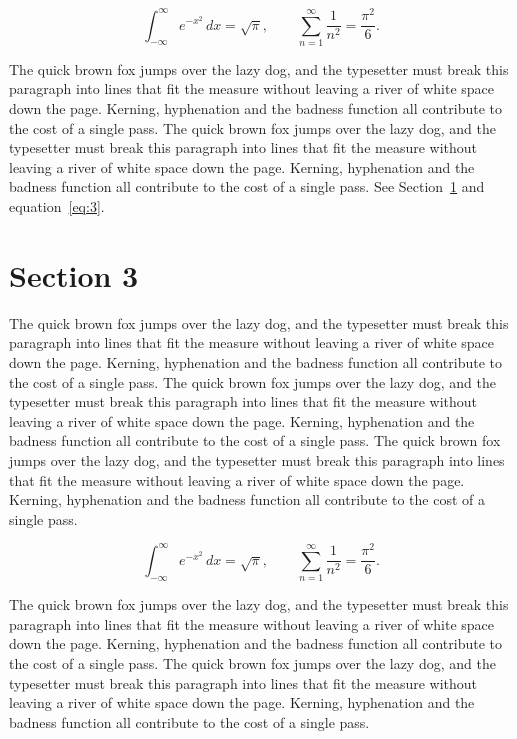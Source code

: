 \documentclass{article}
\begin{document}
\begin{equation}\label{eq:2}
\int_{-\infty}^{\infty} e^{-x^{2}}\,dx = \sqrt{\pi}, \qquad
\sum_{n=1}^{\infty} \frac{1}{n^{2}} = \frac{\pi^{2}}{6}.
\end{equation}

The quick brown fox jumps over the lazy dog, and the typesetter must break this paragraph into lines that fit the measure without leaving a river of white space down the page. Kerning, hyphenation and the badness function all contribute to the cost of a single pass. The quick brown fox jumps over the lazy dog, and the typesetter must break this paragraph into lines that fit the measure without leaving a river of white space down the page. Kerning, hyphenation and the badness function all contribute to the cost of a single pass. 
See Section~\ref{sec:3} and equation~\eqref{eq:3}.
\section{Section 3}
\label{sec:3}
The quick brown fox jumps over the lazy dog, and the typesetter must break this paragraph into lines that fit the measure without leaving a river of white space down the page. Kerning, hyphenation and the badness function all contribute to the cost of a single pass. The quick brown fox jumps over the lazy dog, and the typesetter must break this paragraph into lines that fit the measure without leaving a river of white space down the page. Kerning, hyphenation and the badness function all contribute to the cost of a single pass. The quick brown fox jumps over the lazy dog, and the typesetter must break this paragraph into lines that fit the measure without leaving a river of white space down the page. Kerning, hyphenation and the badness function all contribute to the cost of a single pass. 

\begin{equation}\label{eq:3}
\int_{-\infty}^{\infty} e^{-x^{2}}\,dx = \sqrt{\pi}, \qquad
\sum_{n=1}^{\infty} \frac{1}{n^{2}} = \frac{\pi^{2}}{6}.
\end{equation}

The quick brown fox jumps over the lazy dog, and the typesetter must break this paragraph into lines that fit the measure without leaving a river of white space down the page. Kerning, hyphenation and the badness function all contribute to the cost of a single pass. The quick brown fox jumps over the lazy dog, and the typesetter must break this paragraph into lines that fit the measure without leaving a river of white space down the page. Kerning, hyphenation and the badness function all contribute to the cost of a single pass. 
\end{document}
